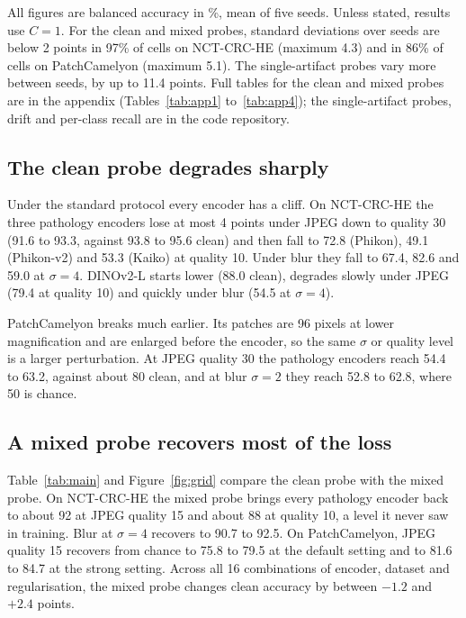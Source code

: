 \documentclass[11pt,a4paper]{article}
\begin{document}
All figures are balanced accuracy in \%, mean of five seeds. Unless stated, results use $C = 1$. For the clean and mixed probes, standard deviations over seeds are below 2 points in 97\% of cells on NCT-CRC-HE (maximum 4.3) and in 86\% of cells on PatchCamelyon (maximum 5.1). The single-artifact probes vary more between seeds, by up to 11.4 points. Full tables for the clean and mixed probes are in the appendix (Tables~\ref{tab:app1} to~\ref{tab:app4}); the single-artifact probes, drift and per-class recall are in the code repository.

\subsection{The clean probe degrades sharply}

Under the standard protocol every encoder has a cliff. On NCT-CRC-HE the three pathology encoders lose at most 4 points under JPEG down to quality 30 (91.6 to 93.3, against 93.8 to 95.6 clean) and then fall to 72.8 (Phikon), 49.1 (Phikon-v2) and 53.3 (Kaiko) at quality 10. Under blur they fall to 67.4, 82.6 and 59.0 at $\sigma = 4$. DINOv2-L starts lower (88.0 clean), degrades slowly under JPEG (79.4 at quality 10) and quickly under blur (54.5 at $\sigma = 4$).

PatchCamelyon breaks much earlier. Its patches are 96 pixels at lower magnification and are enlarged before the encoder, so the same $\sigma$ or quality level is a larger perturbation. At JPEG quality 30 the pathology encoders reach 54.4 to 63.2, against about 80 clean, and at blur $\sigma = 2$ they reach 52.8 to 62.8, where 50 is chance.

\subsection{A mixed probe recovers most of the loss}

Table~\ref{tab:main} and Figure~\ref{fig:grid} compare the clean probe with the mixed probe. On NCT-CRC-HE the mixed probe brings every pathology encoder back to about 92 at JPEG quality 15 and about 88 at quality 10, a level it never saw in training. Blur at $\sigma = 4$ recovers to 90.7 to 92.5. On PatchCamelyon, JPEG quality 15 recovers from chance to 75.8 to 79.5 at the default setting and to 81.6 to 84.7 at the strong setting. Across all 16 combinations of encoder, dataset and regularisation, the mixed probe changes clean accuracy by between $-1.2$ and $+2.4$ points.
\end{document}
